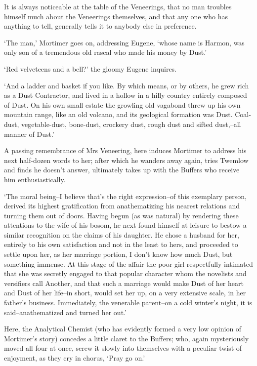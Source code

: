 It is always noticeable at the table of the Veneerings, that no man
troubles himself much about the Veneerings themselves, and that any
one who has anything to tell, generally tells it to anybody else in
preference.

‘The man,’ Mortimer goes on, addressing Eugene, ‘whose name is Harmon,
was only son of a tremendous old rascal who made his money by Dust.’

‘Red velveteens and a bell?’ the gloomy Eugene inquires.

‘And a ladder and basket if you like. By which means, or by others, he
grew rich as a Dust Contractor, and lived in a hollow in a hilly country
entirely composed of Dust. On his own small estate the growling old
vagabond threw up his own mountain range, like an old volcano, and its
geological formation was Dust. Coal-dust, vegetable-dust, bone-dust,
crockery dust, rough dust and sifted dust,--all manner of Dust.’

A passing remembrance of Mrs Veneering, here induces Mortimer to address
his next half-dozen words to her; after which he wanders away again,
tries Twemlow and finds he doesn’t answer, ultimately takes up with the
Buffers who receive him enthusiastically.

‘The moral being--I believe that’s the right expression--of this
exemplary person, derived its highest gratification from anathematizing
his nearest relations and turning them out of doors. Having begun (as
was natural) by rendering these attentions to the wife of his bosom,
he next found himself at leisure to bestow a similar recognition on the
claims of his daughter. He chose a husband for her, entirely to his own
satisfaction and not in the least to hers, and proceeded to settle upon
her, as her marriage portion, I don’t know how much Dust, but something
immense. At this stage of the affair the poor girl respectfully
intimated that she was secretly engaged to that popular character whom
the novelists and versifiers call Another, and that such a marriage
would make Dust of her heart and Dust of her life--in short, would
set her up, on a very extensive scale, in her father’s business.
Immediately, the venerable parent--on a cold winter’s night, it is
said--anathematized and turned her out.’

Here, the Analytical Chemist (who has evidently formed a very low
opinion of Mortimer’s story) concedes a little claret to the Buffers;
who, again mysteriously moved all four at once, screw it slowly into
themselves with a peculiar twist of enjoyment, as they cry in chorus,
‘Pray go on.’

